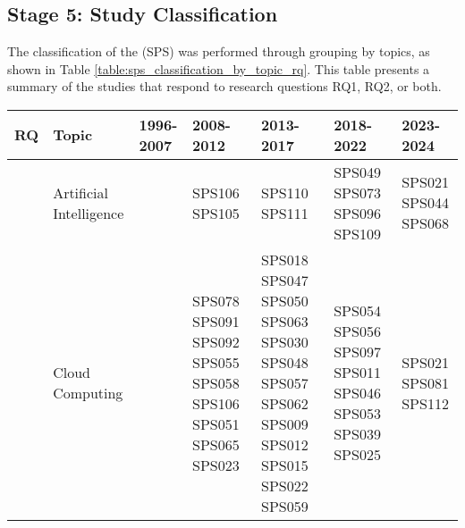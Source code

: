\subsection{Stage 5: Study Classification}\label{subsec:clasificacion-de-estudios}
The classification of the (SPS) was performed through grouping by topics, as shown in Table \ref{table:sps_classification_by_topic_rq}. This table presents a summary of the studies that respond to research questions RQ1, RQ2, or both.

\begin{table}
	{\fontsize{7}{9}\selectfont
		
		\setlength{\tabcolsep}{3pt}
		\begin{tabular}{>{\raggedright\arraybackslash}p{0.9cm}>{\raggedright\arraybackslash}p{2.0cm}>{\raggedright\arraybackslash}p{2.5cm}>{\raggedright\arraybackslash}p{3.0cm}>{\raggedright\arraybackslash}p{3.2cm}>{\raggedright\arraybackslash}p{2.3cm}>{\raggedright\arraybackslash}p{2.3cm}}\toprule
			\textbf{RQ}                    & \textbf{Topic}          & \textbf{1996-2007}                                      & \textbf{2008-2012}                                                                                                            & \textbf{2013-2017}                                                                         & \textbf{2018-2022}                                                                  & \textbf{2023-2024}                 \\
			\midrule
			\multirow{12}{*}{\textbf{RQ1}} & Artificial Intelligence &                                                         & SPS106 SPS105                                                                                                                 & SPS110 SPS111                                                                              & SPS049 SPS073 SPS096 SPS109                                                         & SPS021 SPS044 SPS068               \\[3.0em]
			                               & Cloud Computing         &                                                         & SPS078 SPS091 SPS092 SPS055 SPS058 SPS106 SPS051 SPS065 SPS023                                                                & SPS018 SPS047 SPS050 SPS063 SPS030 SPS048 SPS057 SPS062 SPS009 SPS012 SPS015 SPS022 SPS059 & SPS054 SPS056 SPS097 SPS011 SPS046 SPS053 SPS039 SPS025                             & SPS021 SPS081 SPS112               \\[3.0em]

\end{tabular}}
\end{table}
